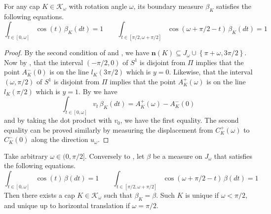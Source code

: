 \begin{theorem}

For any cap \(K \in \mathcal{K}_\omega\) with rotation angle \(\omega\), its boundary measure \(\beta_K\) satisfies the following equations.
\[
\int_{t \in [0, \omega]} \cos(t) \, \beta_K(dt) = 1 \qquad \int_{t \in [\pi/2, \omega + \pi/2]} \cos\left( \omega + \pi/2 - t \right)  \, \beta_K(dt) = 1
\]

\label{thm:boundary-measure-cap}
\end{theorem}

\begin{proof}
By the second condition of  and , we have \(\mathbf{n}(K) \subseteq J_\omega \cup \left\{ \pi + \omega, 3\pi/2 \right\}\). Now by , that the interval \((-\pi/2, 0)\) of \(S^1\) is disjoint from \(\Pi\) implies that the point \(A_K^-(0)\) is on the line \(l_K(3\pi/2)\) which is \(y=0\). Likewise, that the interval \((\omega, \pi/2)\) of \(S^1\) is disjoint from \(\Pi\) implies that the point \(A_K^+(\omega)\) is on the line \(l_K(\pi/2)\) which is \(y=1\). By  we have
\[
\int_{t \in [0, \omega]} v_t \, \beta_K(dt) = A^+_K(\omega) - A^-_K(0)
\]
and by taking the dot product with \(v_0\), we have the first equality. The second equality can be proved similarly by measuring the displacement from \(C_K^+(\omega)\) to \(C_K^-(0)\) along the direction \(u_\omega\).
\end{proof}

\begin{theorem}

Take arbitrary \(\omega \in (0, \pi/2]\). Conversely to , let \(\beta\) be a measure on \(J_\omega\) that satisfies the following equations.
\[
\int_{t \in [0, \omega]} \cos(t) \, \beta(dt) = 1 \qquad \int_{t \in [\pi/2, \omega + \pi/2]} \cos\left( \omega + \pi/2 - t \right)  \, \beta(dt) = 1
\]
Then there exists a cap \(K \in \mathcal{K}_\omega\) such that \(\beta_K = \beta\). Such \(K\) is unique if \(\omega < \pi/2\), and unique up to horizontal translation if \(\omega = \pi/2\).

\label{thm:cap-from-boundary-measure}
\end{theorem}

